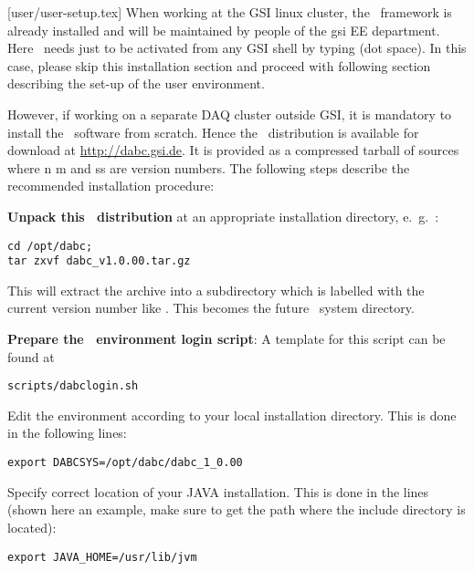 [user/user-setup.tex]
\label{user-setup-chapter}
When working at the GSI linux cluster, the \dabc\ framework is already installed and will
be maintained by people of the gsi EE department. Here \dabc\ needs just to be
activated from any GSI shell by typing  (dot space). In this case, 
please skip this installation section and proceed with following section  describing
the set-up of the user environment.

However, if working on a separate DAQ cluster outside GSI, 
it is mandatory to install the \dabc\ software
from scratch. 
Hence the \dabc\ distribution is available for download at \hyperref{http://dabc.gsi.de}{}{}{http://dabc.gsi.de}.
It is provided as a compressed tarball of sources 
where n m and ss are version numbers.
The following steps describe the recommended installation procedure:

\bnum
\item {\bf Unpack this \dabc\ distribution} at an appropriate installation directory,
e.~g.~:
\begin{small}
\begin{verbatim}
cd /opt/dabc; 
tar zxvf dabc_v1.0.00.tar.gz
\end{verbatim}
\end{small}
This will extract the archive into a subdirectory which is labelled
with the current version number like .
This becomes the future \dabc\ system directory.

\item {\bf Prepare the \dabc\ environment login script}:
A template for this script can be found at  
\begin{small}
\begin{verbatim}
scripts/dabclogin.sh
\end{verbatim}
\end{small}

\bbul
\item Edit the  environment according to your local installation directory. 
This is done in the following lines:
\begin{small}
\begin{verbatim}
export DABCSYS=/opt/dabc/dabc_1_0.00  
\end{verbatim}  
\end{small}
\item Specify correct location of your JAVA installation. This is done in the lines
(shown here an example, make sure to get the path where the include directory is located):
\begin{small}
\begin{verbatim}
export JAVA_HOME=/usr/lib/jvm
\end{verbatim}  
\end{small}

